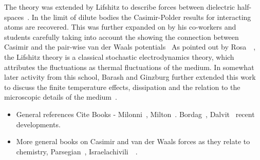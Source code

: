 The theory was extended by Lifshitz to describe forces between dielectric half-spaces~\cite{Lifshitz1956}.
In the limit of dilute bodies the Casimir-Polder results for interacting atoms are recovered.  
This was further expanded on by his co-workers and students carefully taking into account the   
showing the connection between Casimir and the pair-wise van der Waals potentials~
\cite{Dzyaloshinskii1959,Dzyaloshinskii1961}
As pointed out by Rosa~\etal~\cite{Rosa2010}, 
the Lifshitz theory is a classical stochastic electrodynamics theory,
which attributes the fluctuations as thermal fluctuations of the medium.  
In somewhat later activity from this school, Barash and Ginzburg further extended this work to 
discuss the finite temperature effects, dissipation and the relation to the
microscopic details of the medium~\cite{BarashGinzburg1975}.  


\begin{itemize}
\item General references Cite Books - Milonni~\cite{Milonni1994}, Milton~\cite{Milton2001}.
  Bordag~\cite{Bordag2009}, Dalvit~\cite{Dalvit2011} recent developments.  
\item More general books on Casimir and van der Waals forces as they relate to chemistry, 
  Parsegian~\cite{Parsegian2006}, Israelachivili~\etal~\cite{Israelachvili2011}.
\end{itemize}



